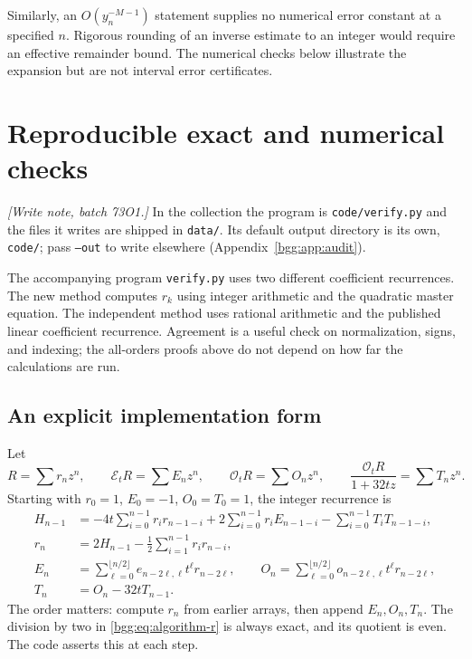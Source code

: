 \documentclass[11pt,a4paper]{article}
\numberwithin{equation}{section}
\theoremstyle{definition}
\theoremstyle{remark}
\theoremstyle{definition}
\newcommand{\Eop}{\mathcal E}
\newcommand{\Oop}{\mathcal O}
\begin{document}
Similarly, an $O(y_n^{-M-1})$ statement supplies no numerical error constant
at a specified $n$. Rigorous rounding of an inverse estimate to an integer
would require an effective remainder bound. The numerical checks below
illustrate the expansion but are not interval error certificates.

\section{Reproducible exact and numerical checks}
\label{bgg:sec:checks}

\emph{[Write note, batch 73O1.]} In the collection the program is
\texttt{code/verify.py} and the files it writes are shipped in
\texttt{data/}. Its default output directory is its own, \texttt{code/};
pass \texttt{--out} to write elsewhere
(Appendix~\ref{bgg:app:audit}).

The accompanying program \texttt{verify.py} uses two different coefficient
recurrences. The new method computes $r_k$ using integer arithmetic and the
quadratic master equation. The independent method uses rational arithmetic
and the published linear coefficient recurrence. Agreement is a useful check
on normalization, signs, and indexing; the all-orders proofs above do not
depend on how far the calculations are run.

\subsection{An explicit implementation form}

Let
\[
 R=\sum r_nz^n,\qquad \Eop_tR=\sum E_nz^n,\qquad
 \Oop_tR=\sum O_nz^n,\qquad
 \frac{\Oop_tR}{1+32tz}=\sum T_nz^n.
\]
Starting with $r_0=1$, $E_0=-1$, $O_0=T_0=1$, the integer recurrence is
\begin{align}
 H_{n-1}&=-4t\sum_{i=0}^{n-1}r_ir_{n-1-i}
          +2\sum_{i=0}^{n-1}r_iE_{n-1-i}
          -\sum_{i=0}^{n-1}T_iT_{n-1-i},\label{bgg:eq:algorithm-H}\\
 r_n&=2H_{n-1}-\frac12\sum_{i=1}^{n-1}r_ir_{n-i},\label{bgg:eq:algorithm-r}\\
 E_n&=\sum_{\ell=0}^{\lfloor n/2\rfloor}
        e_{n-2\ell,\ell}t^\ell r_{n-2\ell},\qquad
 O_n=\sum_{\ell=0}^{\lfloor n/2\rfloor}
        o_{n-2\ell,\ell}t^\ell r_{n-2\ell},\label{bgg:eq:algorithm-EO}\\
 T_n&=O_n-32tT_{n-1}.\label{bgg:eq:algorithm-T}
\end{align}
The order matters: compute $r_n$ from earlier arrays, then append
$E_n,O_n,T_n$. The division by two in \eqref{bgg:eq:algorithm-r} is always exact,
and its quotient is even. The code asserts this at each step.
\end{document}
